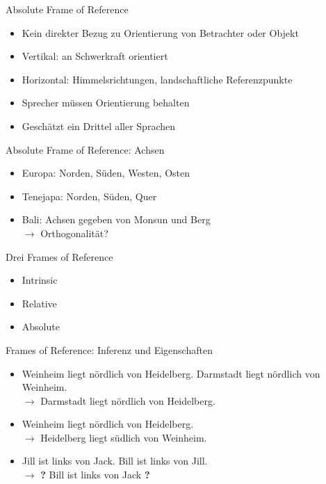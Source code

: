 \documentclass[12pt,a4paper]{beamer}
\begin{document}
\begin{frame}{Absolute Frame of Reference}
\begin{itemize}
\item Kein direkter Bezug zu Orientierung von Betrachter oder Objekt
\item Vertikal: an Schwerkraft orientiert
\item Horizontal: Himmelsrichtungen, landschaftliche Referenzpunkte
\item Sprecher müssen Orientierung behalten
\item Geschätzt ein Drittel aller Sprachen
\end{itemize}
\end{frame}


\begin{frame}{Absolute Frame of Reference: Achsen}
\begin{itemize}
\item Europa: Norden, Süden, Westen, Osten
\item Tenejapa: Norden, Süden, Quer
\item Bali: Achsen gegeben von Monsun und Berg \\
$\to$ Orthogonalität?
\end{itemize}
\end{frame}


\begin{frame}{Drei Frames of Reference}
\begin{itemize}
\item Intrinsic
\item Relative
\item Absolute
\end{itemize}
\end{frame}


\begin{frame}{Frames of Reference: Inferenz und Eigenschaften}
\begin{itemize}
\item Weinheim liegt nördlich von Heidelberg. Darmstadt liegt nördlich von Weinheim. \\
$\to$ Darmstadt liegt nördlich von Heidelberg.
\item Weinheim liegt nördlich von Heidelberg. \\
$\to$ Heidelberg liegt südlich von Weinheim.
\item Jill ist links von Jack. Bill ist links von Jill. \\
$\to$ \textbf{?} Bill ist links von Jack \textbf{?}
\end{itemize}
\end{frame}
\end{document}
